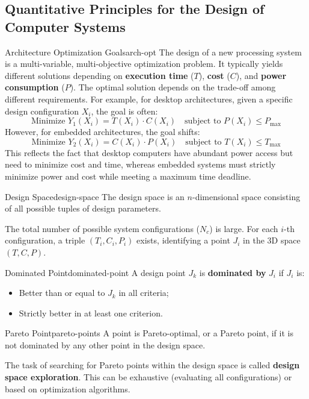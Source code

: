\subsection{Quantitative Principles for the Design of Computer Systems}
\begin{concept}{Architecture Optimization Goals}{arch-opt}
    The design of a new processing system is a multi-variable, multi-objective optimization problem. It typically yields different solutions depending on \textbf{execution time} (\(T\)), \textbf{cost} (\(C\)), and \textbf{power consumption} (\(P\)). The optimal solution depends on the trade-off among different requirements. For example, for desktop architectures, given a specific design configuration \(X_i\), the goal is often:
    \[
        \text{Minimize } Y_1(X_i) = T(X_i) \cdot C(X_i) \quad \text{subject to } P(X_i) \leq P_{\text{max}}
    \]
    However, for embedded architectures, the goal shifts:
    \[
        \text{Minimize } Y_2(X_i) = C(X_i) \cdot P(X_i) \quad \text{subject to } T(X_i) \leq T_{\text{max}}
    \]
    This reflects the fact that desktop computers have abundant power access but need to minimize cost and time, whereas embedded systems must strictly minimize power and cost while meeting a maximum time deadline.
\end{concept}

\begin{concept}{Design Space}{design-space}
    The design space is an \(n\)-dimensional space consisting of all possible tuples of design parameters.
\end{concept}
The total number of possible system configurations (\(N_c\)) is large. For each \(i\)-th configuration, a triple \((T_i, C_i, P_i)\) exists, identifying a point \(J_i\) in the 3D space \((T, C, P)\).

\begin{definition}{Dominated Point}{dominated-point}
    A design point \(J_k\) is \textbf{dominated by} \(J_i\) if \(J_i\) is:
    \begin{itemize}
        \item Better than or equal to \(J_k\) in all criteria;
        \item Strictly better in at least one criterion.
    \end{itemize}
\end{definition}

\begin{definition}{Pareto Point}{pareto-points}
    A point is Pareto-optimal, or a Pareto point, if it is not dominated by any other point in the design space.
\end{definition}
The task of searching for Pareto points within the design space is called \textbf{design space exploration}. This can be exhaustive (evaluating all configurations) or based on optimization algorithms.

